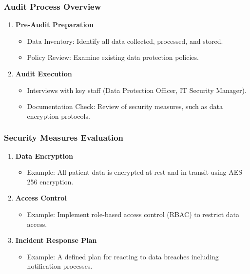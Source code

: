\documentclass{beamer}
\begin{document}
\begin{frame}[fragile]
    \frametitle{Audit Process Overview}
    \begin{enumerate}
        \item \textbf{Pre-Audit Preparation}
            \begin{itemize}
                \item Data Inventory: Identify all data collected, processed, and stored.
                \item Policy Review: Examine existing data protection policies.
            \end{itemize}
        \item \textbf{Audit Execution}
            \begin{itemize}
                \item Interviews with key staff (Data Protection Officer, IT Security Manager).
                \item Documentation Check: Review of security measures, such as data encryption protocols.
            \end{itemize}
    \end{enumerate}
\end{frame}

\begin{frame}[fragile]
    \frametitle{Security Measures Evaluation}
    \begin{enumerate}
        \item \textbf{Data Encryption}
            \begin{itemize}
                \item Example: All patient data is encrypted at rest and in transit using AES-256 encryption.
            \end{itemize}
        \item \textbf{Access Control}
            \begin{itemize}
                \item Example: Implement role-based access control (RBAC) to restrict data access.
            \end{itemize}
        \item \textbf{Incident Response Plan}
            \begin{itemize}
                \item Example: A defined plan for reacting to data breaches including notification processes.
            \end{itemize}
    \end{enumerate}
\end{frame}
\end{document}
